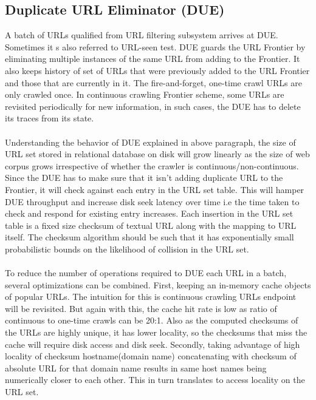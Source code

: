 \subsection{Duplicate URL Eliminator (DUE)}
A batch of URLs qualified from URL filtering subsystem arrives at DUE. Sometimes it s also referred to URL-seen test. DUE guards the URL Frontier by eliminating
multiple instances of the same URL from adding to the Frontier. It also keeps history of set of URLs that were previously added to the URL Frontier and those that are
currently in it. The fire-and-forget, one-time crawl URLs are only crawled once. In
continuous crawling Frontier scheme, some URLs are revisited periodically for new information, in such cases, the DUE has to delete its traces from its state.
\\
\\
\noindent
Understanding the behavior of DUE explained in above paragraph, the size of URL set stored in relational database on disk will grow linearly as the size of web corpus grows irrespective of whether the crawler is continuous/non-continuous. Since the DUE has to make sure that it isn't adding duplicate URL to the Frontier, it will check against each entry in the URL set table. This will hamper DUE throughput and increase disk seek latency over time i.e the time taken to check and respond for existing entry increases. Each insertion in the URL set table is a fixed size checksum of
textual URL along with the mapping to URL itself. The checksum algorithm should be
such that it has exponentially small probabilistic bounds on the likelihood of
collision in the URL set.
\\
\\
To reduce the number of operations required to DUE each URL in a batch, several
optimizations can be combined. First, keeping an in-memory cache objects of popular URLs. The intuition for this is continuous crawling URLs endpoint will be revisited. But again with this, the cache hit rate is low as ratio of continuous to one-time crawls can be 20:1. Also as the computed checksums of the URLs are highly unique, it has lower locality, so the checksums that miss the cache will require disk access and disk seek. Secondly, taking advantage of high locality of checksum hostname(domain name) concatenating with checksum of absolute URL for that domain name results in
same host names being numerically closer to each other. This in turn translates to
access locality on the URL set.

\pagebreak

